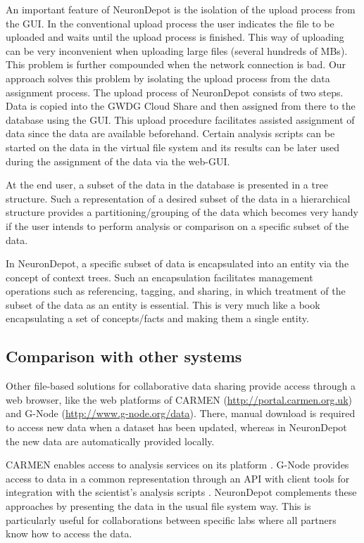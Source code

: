 \documentclass{frontiersSCNS} %
\begin{document}
An important feature of NeuronDepot is the isolation of the upload process from
the GUI. In the conventional upload process the user indicates the file to be
uploaded and waits until the upload process is finished. This way of uploading
can be very inconvenient when uploading large files (several hundreds of MBs).
This problem is further compounded when the network connection is bad. Our
approach solves this problem by isolating the upload process from the data
assignment process. The upload process of NeuronDepot consists of two steps.
Data is copied into the GWDG Cloud Share and then assigned from there to the
database using the GUI. This upload procedure facilitates assisted assignment
of data since the data are available beforehand. Certain analysis scripts can be
started on the data in the virtual file system and its results can be later
used during the assignment of the data via the web-GUI.

At the end user, a subset of the data in the database is presented in a tree
structure. Such a representation of a desired subset of the data in a hierarchical
structure provides a partitioning/grouping of the data which becomes very handy
if the user intends to perform analysis or comparison on a specific subset of
the data.

In NeuronDepot, a specific subset of data is encapsulated into an entity via
the concept of context trees. Such an encapsulation facilitates management
operations such as referencing, tagging, and sharing, in which treatment of the
subset of the data as an entity is essential. This is very much like a book
encapsulating a set of concepts/facts and making them a single entity.

\subsection{Comparison with other systems}

Other file-based solutions for collaborative data sharing provide access
through a web browser, like the web platforms of CARMEN
(\url{http://portal.carmen.org.uk}) and G-Node
(\url{http://www.g-node.org/data}). There, manual download is required to
access new data when a dataset has been updated, whereas in NeuronDepot
the new data are automatically provided locally.

CARMEN enables access to analysis services on its platform
\citep{austin_carmen:_2011}. G-Node provides access to data in a common
representation through an API \citep{Sobolev2014b} with client tools for
integration with the scientist's analysis scripts \citep{Sobolev2014a}.
NeuronDepot complements these approaches by presenting the data in the usual
file system way. This is particularly useful for collaborations between
specific labs where all partners know how to access the data.
\end{document}
